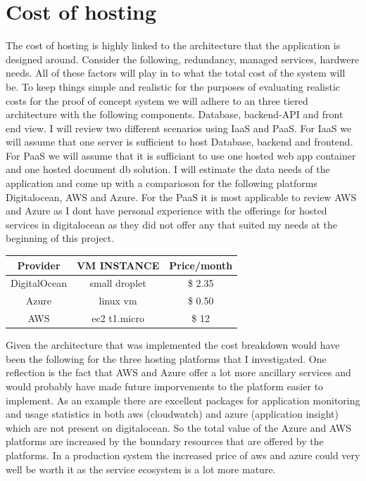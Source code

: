 \documentclass[]{uiophd}
\begin{document}
\section{Cost of hosting}
The cost of hosting is highly linked to the architecture that the application is designed around. Consider the following, redundancy, managed services, hardwere needs. All of these factors will play in to what the total cost of the system will be. To keep things simple and realistic for the purposes of evaluating realistic costs for the proof of concept system we will adhere to an three tiered architecture with the following components. Database, backend-API and front end view. I will review two different scenarios using IaaS and PaaS. For IaaS we will assume that one server is sufficient to host Database, backend and frontend. For PaaS we will assume that it is sufficiant to use one hosted web app container and one hosted document db solution. I will estimate the data needs of the application and come up with a comparioson for the following platforms Digitalocean, AWS and Azure. For the PaaS it is most applicable to review AWS and Azure as I dont have personal experience with the offerings for hosted services in digitalocean as they did not offer any that suited my needs at the beginning of this project.

\begin{center}
 \begin{tabular}{||c | c | c ||} 
 \hline
 Provider & VM INSTANCE & Price/month \\ [0.5ex] 
 \hline\hline
 DigitalOcean & small droplet & \$ 2.35 \\ 
 \hline
 Azure & linux vm &\$ 0.50 \\
 \hline
 AWS & ec2 t1.micro &\$ 12 \\
 \hline
\end{tabular}
\end{center}

Given the architecture that was implemented the cost breakdown would have been the following for the three hosting platforms that I investigated. One reflection is the fact that AWS and Azure offer a lot more ancillary services and would probably have made future imporvements to the platform easier to implement. As an example there are excellent packages for application monitoring and usage statistics in both aws (cloudwatch) and azure (application insight) which are not present on digitalocean. So the total value of the Azure and AWS platforms are increased by the boundary resources that are offered by the platforms. In a production system the increased price of aws and azure could very well be worth it as the service ecosystem is a lot more mature. 
\end{document}
